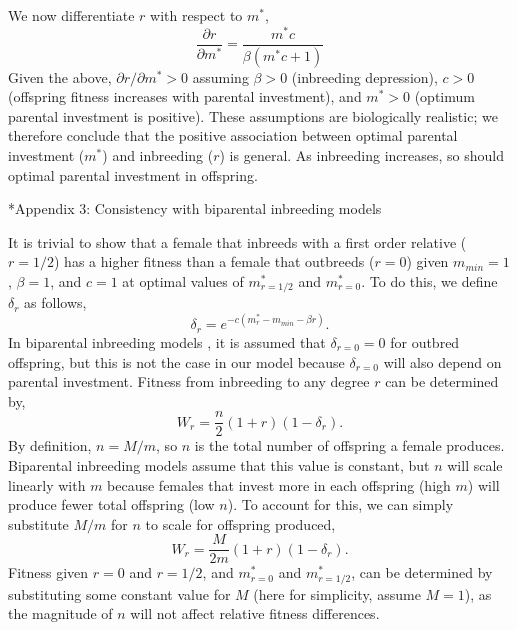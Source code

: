 \documentclass[12pt]{article}
\makeatletter
\renewcommand\section{\@startsection{section}{1}{0in}{-0.5\baselineskip}{0.1\baselineskip}{\normalfont\large\bfseries}}
\makeatother
\begin{document}
We now differentiate $r$ with respect to $m^{*}$,
\begin{equation}
\frac{\partial r}{\partial m^{*}} = \frac{m^{*} c}{\beta \left(m^{*} c + 1\right)} 
\end{equation}
Given the above, $\partial r / \partial m^{*} > 0$ assuming $\beta>0$ (inbreeding depression), $c>0$ (offspring fitness increases with parental investment), and $m^{*}>0$ (optimum parental investment is positive). These assumptions are biologically realistic; we therefore conclude that the positive association between optimal parental investment ($m^{*}$) and inbreeding ($r$) is general. As inbreeding increases, so should optimal parental investment in offspring.

\section*{Appendix 3: Consistency with biparental inbreeding models}

It is trivial to show that a female that inbreeds with a first order relative ($r=1/2$) has a higher fitness than a female that outbreeds ($r=0$) given $m_{min}=1$, $\beta=1$, and $c=1$ at optimal values of $m^{*}_{r=1/2}$ and $m^{*}_{r=0}$. To do this, we define $\delta_{r}$ as follows,
\begin{equation}
\delta_{r} = e^{-c(m^{*}_{r}-m_{min}-\beta r)}.
\end{equation}
In biparental inbreeding models \cite[e.g.,][]{Kokko2006, Parker2006, Duthie2015a}, it is assumed that $\delta_{r=0}=0$ for outbred offspring, but this is not the case in our model because $\delta_{r=0}$ will also depend on parental investment. Fitness from inbreeding to any degree $r$ can be determined by,
\begin{equation}
W_{r} = \frac{n}{2}\left(1+r\right)\left(1-\delta_{r}\right).
\end{equation}
By definition, $n = M/m$, so $n$ is the total number of offspring a female produces. Biparental inbreeding models assume that this value is constant, but $n$ will scale linearly with $m$ because females that invest more in each offspring (high $m$) will produce fewer total offspring (low $n$). To account for this, we can simply substitute $M/m$ for $n$ to scale for offspring produced,
\begin{equation}
W_{r} = \frac{M}{2 m}\left(1+r\right)\left(1-\delta_{r}\right).
\end{equation}
Fitness given $r=0$ and $r=1/2$, and $m^{*}_{r=0}$ and $m^{*}_{r=1/2}$, can be determined by substituting some constant value for $M$ (here for simplicity, assume $M=1$), as the magnitude of $n$ will not affect relative fitness differences. 
\end{document}

